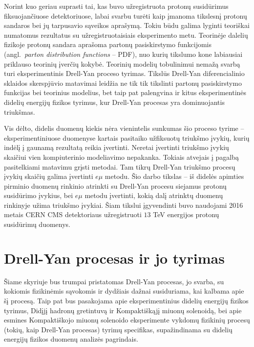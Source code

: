 \documentclass[a4paper, 12pt]{article}
\newcommand{\emu}{e\mu}
\begin{document}
Norint kuo geriau suprasti tai, kas buvo užregistruota protonų susidūrimus
fiksuojančiuose detektoriuose, labai svarbu turėti kaip įmanoma tikslesnį protonų
sandaros bei jų tarpusavio sąveikos aprašymą.
Tokiu būdu galima lyginti teoriškai numatomus rezultatus su užregistruotaisiais eksperimento
metu.
Teorinėje dalelių fizikoje protonų sandara aprašoma partonų pasiskirstymo funkcijomis
(angl.\ \textit{parton distribution functions} -- PDF), nuo kurių tikslumo kone labiausiai
priklauso teorinių įverčių kokybė.
Teorinių modelių tobulinimui nemažą svarbą turi eksperimentinis Drell-Yan proceso tyrimas.
Tikslūs Drell-Yan diferencialinio sklaidos skerspjūvio matavimai leidžia ne tik tik tikslinti
partonų pasiskirstymo funkcijas bei teorinius modelius, bet taip pat palengvina ir kitus
eksperimentinės didelių energijų fizikos tyrimus, kur Drell-Yan procesas yra dominuojantis triukšmas.

Vis dėlto, didelis duomenų kiekis nėra vienintelis sunkumas šio proceso tyrime -- eksperimentiniuose
duomenyse kartais pasitaiko užfiksuotų triukšmo įvykių, kurių indėlį į gaunamą rezultatą reikia
įvertinti.
Neretai įvertinti triukšmo įvykių skaičiui vien kompiuterinio modeliavimo nepakanka.
Tokiais atvejais į pagalbą pasitelkiami matavimu grįsti metodai.
Tam tikrų Drell-Yan triukšmo procesų įvykių skaičių galima įvertinti $\emu$ metodu.
Šio darbo tikslas -- iš didelės apimties pirminio duomenų rinkinio atrinkti su Drell-Yan
procesu siejamus protonų susidūrimo įvykius, bei $\emu$ metodu įvertinti, kokią dalį atrinktų
duomenų rinkinyje užima triukšmo įvykiai. Šiam tikslui įgyvendinti buvo naudojami 2016 metais
CERN CMS detektoriaus užregistruoti $13$ TeV energijos protonų susidūrimų duomenys.

\clearpage

\section{Drell-Yan procesas ir jo tyrimas}

Šiame skyriuje bus trumpai pristatomas Drell-Yan procesas, jo svarba, su kokiomis fizikinėmis
sąvokomis ir dydžiais dažnai susiduriama, kai kalbama apie šį procesą.
Taip pat bus pasakojama apie eksperimentinius didelių energijų fizikos tyrimus, Didįjį hadronų
gretintuvą ir Kompaktiškąjį miuonų solenoidą, bei apie esmines Kompaktiškojo miuonų
solenoido eksperimente vykdomų fizikinių procesų (tokių, kaip Drell-Yan procesas) tyrimų
specifikas, supažindinama su didelių energijų fizikos duomenų analizės pagrindais.
\end{document}
